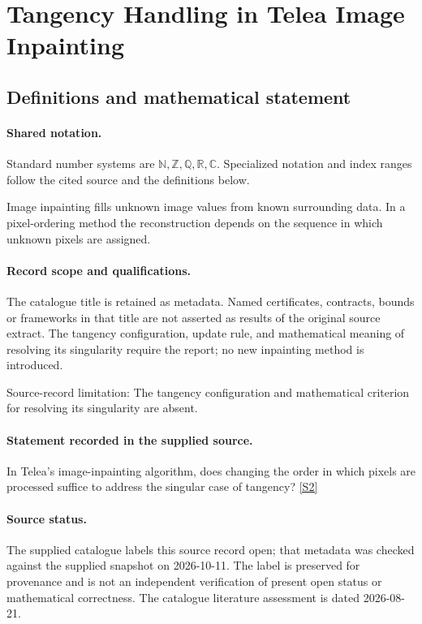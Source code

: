 \documentclass[11pt]{article}
\newcommand{\sref}[2]{\hyperlink{source:#1:#2}{[S#2]}}
\begin{document}
\section{Tangency Handling in Telea Image Inpainting}\label{statement}

\subsection{Definitions and mathematical statement}

\paragraph{Shared notation.}Standard number systems are $\mathbb N,\mathbb Z,\mathbb Q,\mathbb R,\mathbb C$. Specialized notation and index ranges follow the cited source and the definitions below.


Image inpainting fills unknown image values from known surrounding data. In a pixel-ordering method the reconstruction depends on the sequence in which unknown pixels are assigned.
\paragraph{Record scope and qualifications.}
The catalogue title is retained as metadata. Named certificates, contracts, bounds or frameworks in that title are not asserted as results of the original source extract.
The tangency configuration, update rule, and mathematical meaning of resolving its singularity require the report; no new inpainting method is introduced.

Source-record limitation: The tangency configuration and mathematical criterion for resolving its singularity are absent.
\paragraph{Statement recorded in the supplied source.}
In Telea's image-inpainting algorithm, does changing the order in which pixels are processed suffice to address the singular case of tangency? \sref{statement}{2}
\paragraph{Source status.}
The supplied catalogue labels this source record open; that metadata was checked against the supplied snapshot on 2026-10-11. The label is preserved for provenance and is not an independent verification of present open status or mathematical correctness. The catalogue literature assessment is dated 2026-08-21.
\end{document}
